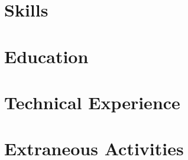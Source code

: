 \documentclass[letter,10pt]{article}
\begin{document}
%

\section{Skills}


\section{Education}


\section{Technical Experience}



\section{Extraneous Activities}

\end{document}
